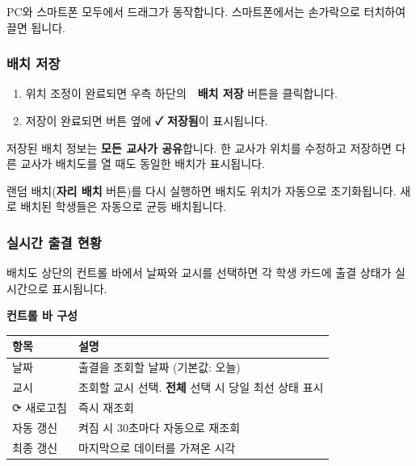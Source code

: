 \documentclass[a4paper,12pt]{article}
\newcommand{\menu}[1]{\textcolor{primary}{\textbf{#1}}}
\begin{document}
\begin{notebox}
  PC와 스마트폰 모두에서 드래그가 동작합니다. 스마트폰에서는 손가락으로 터치하여 끌면 됩니다.
\end{notebox}

\subsubsection{배치 저장}

\begin{enumerate}[leftmargin=1.5em]
    \item 위치 조정이 완료되면 우측 하단의 \menu{💾 배치 저장} 버튼을 클릭합니다.
    \item 저장이 완료되면 버튼 옆에 \textbf{✓ 저장됨}이 표시됩니다.
\end{enumerate}

\begin{tipbox}
  저장된 배치 정보는 \textbf{모든 교사가 공유}합니다. 한 교사가 위치를 수정하고 저장하면
  다른 교사가 배치도를 열 때도 동일한 배치가 표시됩니다.
\end{tipbox}

\begin{notebox}
  랜덤 배치(\menu{자리 배치} 버튼)를 다시 실행하면 배치도 위치가 자동으로 초기화됩니다.
  새로 배치된 학생들은 자동으로 균등 배치됩니다.
\end{notebox}

\subsubsection{실시간 출결 현황}

배치도 상단의 컨트롤 바에서 날짜와 교시를 선택하면 각 학생 카드에 출결 상태가 실시간으로 표시됩니다.

\textbf{컨트롤 바 구성}

\begin{center}
\begin{tabular}{ll}
\toprule
\textbf{항목} & \textbf{설명} \\
\midrule
날짜 & 출결을 조회할 날짜 (기본값: 오늘) \\
교시 & 조회할 교시 선택. \menu{전체} 선택 시 당일 최선 상태 표시 \\
⟳ 새로고침 & 즉시 재조회 \\
자동 갱신 & 켜짐 시 30초마다 자동으로 재조회 \\
최종 갱신 & 마지막으로 데이터를 가져온 시각 \\
\bottomrule
\end{tabular}
\end{center}
\end{document}
